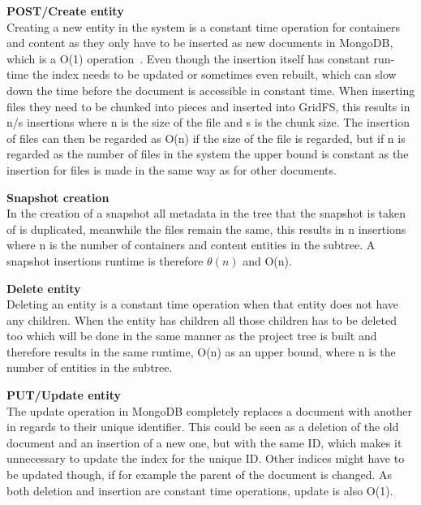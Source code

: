 \documentclass[a4paper,12pt]{article}
\begin{document}
\par \textbf{POST/Create entity} \\
Creating a new entity in the system is a constant time operation for containers and content as they
only have to be inserted as new documents in MongoDB, which is a O(1)
operation~\cite{MONGOPERFORMANCE}. Even though the insertion itself has constant run-time the index
needs to be updated or sometimes even rebuilt, which can slow down the time before the document is
accessible in constant time. When inserting files they need to be chunked into pieces and inserted
into GridFS, this results in n/s insertions where n is the size of the file and s is the chunk size.
The insertion of files can then be regarded as O(n) if the size of the file is regarded, but if n is
regarded as the number of files in the system the upper bound is constant as the insertion for files
is made in the same way as for other documents.\\

\par \textbf{Snapshot creation} \\
In the creation of a snapshot all metadata in the tree that the snapshot is taken of is duplicated,
meanwhile the files remain the same, this results in n insertions where n is the number of
containers and content entities in the subtree. A snapshot insertions runtime is therefore
$\theta(n)$ and O(n). \\

\par \textbf{Delete entity} \\
Deleting an entity is a constant time operation when that entity does not have any children. When
the entity has children all those children has to be deleted too which will be done in the same
manner as the project tree is built and therefore results in the same runtime, O(n) as an upper
bound, where n is the number of entities in the subtree.\\

\par \textbf{PUT/Update entity} \\
The update operation in MongoDB completely replaces a document with another in regards to their
unique identifier. This could be seen as a deletion of the old document and an insertion of a new
one, but with the same ID, which makes it unnecessary to update the index for the unique ID. Other 
indices might have to be updated though, if for example the parent of the document is changed. 
As both deletion and insertion are constant time operations, update is also O(1).\\
\end{document}
